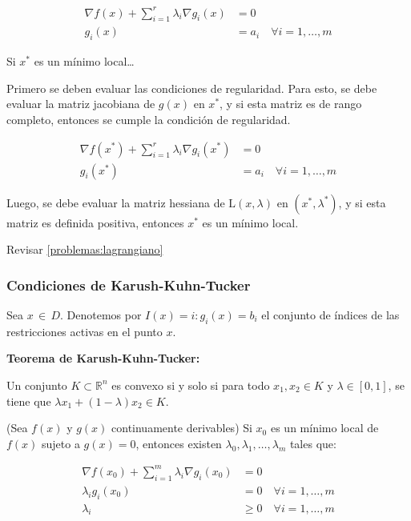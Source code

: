 \documentclass{article}
\begin{document}
\begin{align*}
    \nabla f(x) + \sum_{i=1}^r \lambda_i \nabla g_i(x) & = 0                                  \\
    g_i(x)                                             & = a_i \quad \forall i = 1, \ldots, m
\end{align*}

Si $x^*$ es un mínimo local\dots


Primero se deben evaluar las condiciones de regularidad. Para esto, se debe evaluar la matriz jacobiana de $g(x)$ en $x^*$, y si esta matriz es de rango completo, entonces se cumple la condición de regularidad.

\begin{align*}
    \nabla f(x^*) + \sum_{i=1}^r \lambda_i \nabla g_i(x^*) & = 0                                  \\
    g_i(x^*)                                               & = a_i \quad \forall i = 1, \ldots, m
\end{align*}

Luego, se debe evaluar la matriz hessiana de $\mathrm{L}(x, \lambda)$ en $(x^*, \lambda^*)$, y si esta matriz es definida positiva, entonces $x^*$ es un mínimo local.

Revisar \ref{problemas:lagrangiano}

\subsubsection{Condiciones de Karush-Kuhn-Tucker}

Sea $x \, \in \, D$. Denotemos por $I(x)={i:g_i(x)=b_i}$ el conjunto de índices de las restricciones activas en el punto $x$.

\textbf{Teorema de Karush-Kuhn-Tucker:}

Un conjunto $K \subset \mathbb{R}^n$ es convexo si y solo si para todo $x_1, x_2 \in K$ y $\lambda \in [0, 1]$, se tiene que $\lambda x_1 + (1 - \lambda) x_2 \in K$.

(Sea $f(x)$ y $g(x)$ continuamente derivables) Si $x_0$ es un mínimo local de $f(x)$ sujeto a $g(x) = 0$, entonces existen $\lambda_0, \lambda_1, \ldots, \lambda_m$ tales que:

\begin{align*}
    \nabla f(x_0) + \sum_{i=1}^{m} \lambda_i \nabla g_i(x_0) & = 0                                   \\
    \lambda_i g_i(x_0)                                       & = 0 \quad \forall i = 1, \ldots, m    \\
    \lambda_i                                                & \geq 0 \quad \forall i = 1, \ldots, m
\end{align*}
\end{document}
